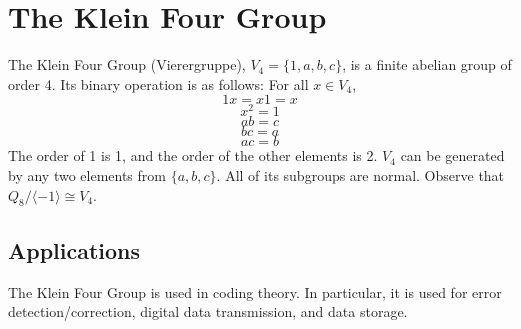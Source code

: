 \documentclass{article}
\begin{document}
\section{The Klein Four Group}
The Klein Four Group (Vierergruppe), $V_4 = \{1, a, b, c\}$, is a finite abelian group of order 4. Its binary operation is as follows: For all $x \in V_4$,
$$1x = x1 = x$$
$$x^2 = 1$$
$$ab = c$$
$$bc = a$$
$$ac = b$$
The order of 1 is 1, and the order of the other elements is 2. $V_4$ can be generated by any two elements from $\{ a, b, c \}$. All of its subgroups are normal. Observe that $Q_8 / \langle -1 \rangle \cong V_4$.
\begin{center}
\end{center}

\subsection*{Applications}
The Klein Four Group is used in coding theory. In particular, it is used for error detection/correction, digital data transmission, and data storage. 
\end{document}
